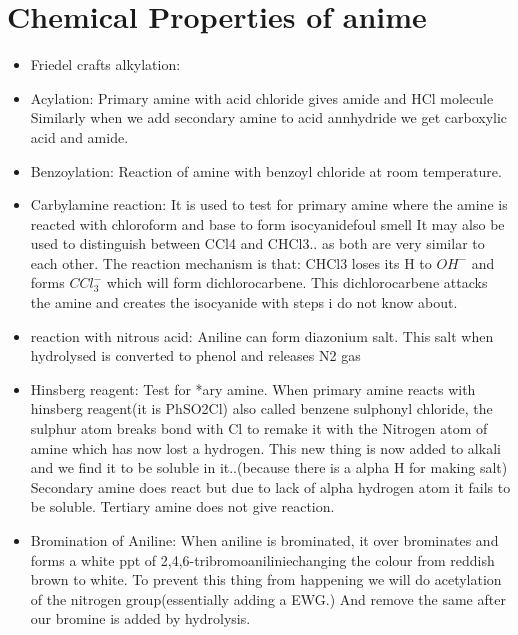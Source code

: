 \documentclass[12pt]{article}
\begin{document}
\section*{Chemical Properties of anime}
\begin{itemize}

\item Friedel crafts alkylation: 

\item  Acylation: Primary amine with acid chloride gives amide 
and HCl molecule Similarly when we add secondary amine to acid 
annhydride we get carboxylic acid and amide.

\item Benzoylation: Reaction of amine with benzoyl chloride at room
temperature. 

\item Carbylamine reaction: It is used to test for primary amine
where the amine is reacted with chloroform and base to form isocyanide{foul smell}
It may also be used to distinguish between CCl4 and CHCl3.. as both 
are very similar to each other. The reaction mechanism is that: CHCl3
loses its H to $OH^{-}$ and forms $CCl_{3}^{-}$ which will form 
dichlorocarbene. This dichlorocarbene attacks the amine and creates
the isocyanide with steps i do not know about.

\item reaction with nitrous acid: Aniline can form diazonium salt.
This salt when hydrolysed is converted to phenol and releases N2 
gas

\item Hinsberg reagent: Test for *ary amine. When primary amine
reacts with hinsberg reagent(it is PhSO2Cl) also called benzene
sulphonyl chloride, the sulphur atom breaks bond with Cl to remake 
it with the Nitrogen atom of amine which has now lost a hydrogen.
This new thing is now added to alkali and we find it to be soluble in
it..(because there is a alpha H for making salt)
Secondary amine does react but due to lack of alpha hydrogen atom 
it fails to be soluble.
Tertiary amine does not give reaction.

\item Bromination of Aniline: When aniline is brominated, it over 
brominates and forms a white ppt of 2,4,6-tribromoanilinie{changing 
the colour from reddish brown to white}. To prevent this thing from
happening we will do acetylation of the nitrogen group(essentially
adding a EWG.) And remove the same after our bromine is added by
hydrolysis.


\end{itemize}
\end{document}

